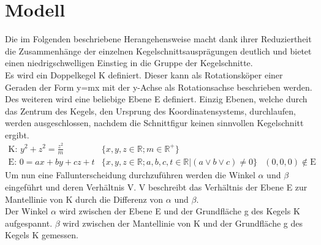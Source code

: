 \setcounter{section}{0}
\section{Modell}
Die im Folgenden beschriebene Herangehensweise macht dank ihrer Reduziertheit die Zusammenhänge der einzelnen Kegelschnittsausprägungen deutlich und bietet einen niedrigschwelligen Einstieg in die Gruppe der Kegelschnitte.\\
Es wird ein Doppelkegel K definiert. Dieser kann als Rotationsköper einer Geraden  der Form y=mx mit der y-Achse als Rotationsachse beschrieben werden. Des weiteren wird eine beliebige Ebene E definiert. Einzig Ebenen, welche durch das Zentrum des Kegels, den Ursprung des Koordinatensystems, durchlaufen, werden ausgeschlossen, nachdem die Schnittfigur keinen sinnvollen Kegelschnitt ergibt.
\begin{displaymath}
	\begin{array}{lrl}
		\text{K: }y^2+z^2=\frac{z^2}{m} & \{x,y,z\in \mathbb{R};m\in \mathbb{R}^{\!+\!}\}\\
		\text{E: }0=ax+by+cz+t & \{x,y,z\in \mathbb{R}; a,b,c,t\in \mathbb{R}|(a  \lor b \lor c) \neq 0\} & (0,0,0) \notin \text{E}
	\end{array}
\end{displaymath}
Um nun eine Fallunterscheidung durchzuführen werden die Winkel \(\alpha\) und \(\beta\) eingeführt und deren Verhältnis V. V beschreibt das Verhältnis der Ebene E zur Mantellinie von K durch die Differenz von \(\alpha\) und \(\beta\).\\
Der Winkel \(\alpha\) wird zwischen der Ebene E und der Grundfläche g des Kegels K aufgespannt. \(\beta\) wird zwischen der Mantellinie von K und der Grundfläche g des Kegels K gemessen.\\


